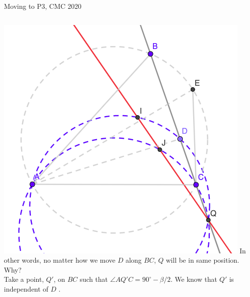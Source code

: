 \documentclass{beamer}
\begin{document}
\begin{frame}{Moving to P3, CMC 2020}
	\begin{columns}
		\includegraphics[scale=0.34]{spi11.png}
		In other words, no matter
		how we move $D$ along $BC$, $Q$ will be in same position.\\
		\phantom{Spacing}
		Why?\\
		\phantom{Spacing}
		Take a point, $Q'$, on $BC$ such that $\angle AQ'C = 
		90^\circ - \beta/2$. We know that $Q'$ is independent of $D$
		.
	\end{columns}
\end{frame}
\end{document}
